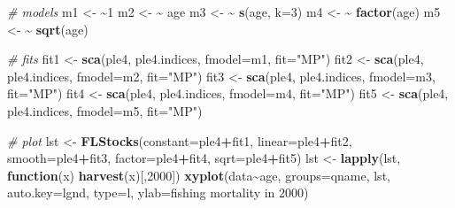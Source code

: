 \documentclass[
]{book}
\newenvironment{Shaded}{\begin{snugshade}}{\end{snugshade}}
\newcommand{\AttributeTok}[1]{\textcolor[rgb]{0.13,0.29,0.53}{#1}}
\newcommand{\CommentTok}[1]{\textcolor[rgb]{0.56,0.35,0.01}{\textit{#1}}}
\newcommand{\ControlFlowTok}[1]{\textcolor[rgb]{0.13,0.29,0.53}{\textbf{#1}}}
\newcommand{\DecValTok}[1]{\textcolor[rgb]{0.00,0.00,0.81}{#1}}
\newcommand{\ErrorTok}[1]{\textcolor[rgb]{0.64,0.00,0.00}{\textbf{#1}}}
\newcommand{\FunctionTok}[1]{\textcolor[rgb]{0.13,0.29,0.53}{\textbf{#1}}}
\newcommand{\NormalTok}[1]{#1}
\newcommand{\OtherTok}[1]{\textcolor[rgb]{0.56,0.35,0.01}{#1}}
\newcommand{\SpecialCharTok}[1]{\textcolor[rgb]{0.81,0.36,0.00}{\textbf{#1}}}
\newcommand{\StringTok}[1]{\textcolor[rgb]{0.31,0.60,0.02}{#1}}
\begin{document}
\begin{Shaded}
\begin{Highlighting}[]
\CommentTok{\# models}
\NormalTok{m1 }\OtherTok{\textless{}{-}} \ErrorTok{\textasciitilde{}}\DecValTok{1}
\NormalTok{m2 }\OtherTok{\textless{}{-}} \ErrorTok{\textasciitilde{}}\NormalTok{ age}
\NormalTok{m3 }\OtherTok{\textless{}{-}} \ErrorTok{\textasciitilde{}} \FunctionTok{s}\NormalTok{(age, }\AttributeTok{k=}\DecValTok{3}\NormalTok{)}
\NormalTok{m4 }\OtherTok{\textless{}{-}} \ErrorTok{\textasciitilde{}} \FunctionTok{factor}\NormalTok{(age)}
\NormalTok{m5 }\OtherTok{\textless{}{-}} \ErrorTok{\textasciitilde{}} \FunctionTok{sqrt}\NormalTok{(age)}

\CommentTok{\# fits}
\NormalTok{fit1 }\OtherTok{\textless{}{-}} \FunctionTok{sca}\NormalTok{(ple4, ple4.indices, }\AttributeTok{fmodel=}\NormalTok{m1, }\AttributeTok{fit=}\StringTok{"MP"}\NormalTok{)}
\NormalTok{fit2 }\OtherTok{\textless{}{-}} \FunctionTok{sca}\NormalTok{(ple4, ple4.indices, }\AttributeTok{fmodel=}\NormalTok{m2, }\AttributeTok{fit=}\StringTok{"MP"}\NormalTok{)}
\NormalTok{fit3 }\OtherTok{\textless{}{-}} \FunctionTok{sca}\NormalTok{(ple4, ple4.indices, }\AttributeTok{fmodel=}\NormalTok{m3, }\AttributeTok{fit=}\StringTok{"MP"}\NormalTok{)}
\NormalTok{fit4 }\OtherTok{\textless{}{-}} \FunctionTok{sca}\NormalTok{(ple4, ple4.indices, }\AttributeTok{fmodel=}\NormalTok{m4, }\AttributeTok{fit=}\StringTok{"MP"}\NormalTok{)}
\NormalTok{fit5 }\OtherTok{\textless{}{-}} \FunctionTok{sca}\NormalTok{(ple4, ple4.indices, }\AttributeTok{fmodel=}\NormalTok{m5, }\AttributeTok{fit=}\StringTok{"MP"}\NormalTok{)}

\CommentTok{\# plot}
\NormalTok{lst }\OtherTok{\textless{}{-}} \FunctionTok{FLStocks}\NormalTok{(}\AttributeTok{constant=}\NormalTok{ple4}\SpecialCharTok{+}\NormalTok{fit1, }\AttributeTok{linear=}\NormalTok{ple4}\SpecialCharTok{+}\NormalTok{fit2, }\AttributeTok{smooth=}\NormalTok{ple4}\SpecialCharTok{+}\NormalTok{fit3, }\AttributeTok{factor=}\NormalTok{ple4}\SpecialCharTok{+}\NormalTok{fit4, }\AttributeTok{sqrt=}\NormalTok{ple4}\SpecialCharTok{+}\NormalTok{fit5)}
\NormalTok{lst }\OtherTok{\textless{}{-}} \FunctionTok{lapply}\NormalTok{(lst, }\ControlFlowTok{function}\NormalTok{(x) }\FunctionTok{harvest}\NormalTok{(x)[,}\StringTok{\textquotesingle{}2000\textquotesingle{}}\NormalTok{])}
\FunctionTok{xyplot}\NormalTok{(data}\SpecialCharTok{\textasciitilde{}}\NormalTok{age, }\AttributeTok{groups=}\NormalTok{qname, lst, }\AttributeTok{auto.key=}\NormalTok{lgnd, }\AttributeTok{type=}\StringTok{\textquotesingle{}l\textquotesingle{}}\NormalTok{, }\AttributeTok{ylab=}\StringTok{\textquotesingle{}fishing mortality in 2000\textquotesingle{}}\NormalTok{)}
\end{Highlighting}
\end{Shaded}
\end{document}
